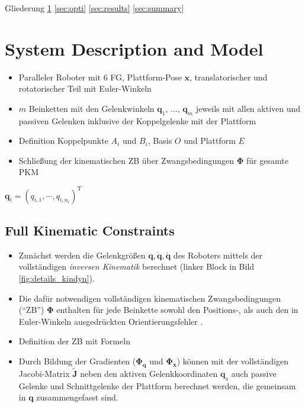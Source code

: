 \documentclass[fleqn,a4paper,10pt]{article}
\newcommand{\bm}[1]{\mathbf{#1}}
\renewcommand{\Phi}[1]{\varPhi{#1}}
\newcommand{\transp}[0]{{\mathrm{T}}}
\renewenvironment{figure}
  {\par\vspace{6pt}\noindent\minipage{\linewidth}}
  {\endminipage\par\vspace{6pt}}
\begin{document}
\begin{multicols}{2}
Gliederung
\ref{sec:sysmdl}
\ref{sec:opti}
\ref{sec:results}
\ref{sec:summary}

\section{System Description and Model}
\label{sec:sysmdl}

\cite{BriotKha2015}

\begin{figure}
\graphicspath{{./Bilder/}}
\centering

\label{fig:PKM_kinematics}
\end{figure}

\begin{itemize}
\item Paralleler Roboter mit 6 FG, Plattform-Pose $\bm{x}$, translatorischer und rotatorischer Teil mit Euler-Winkeln
\item $m$ Beinketten mit den Gelenkwinkeln $\bm{q}_1$, ..., $\bm{q}_m$ jeweils mit allen aktiven und passiven Gelenken inklusive der Koppelgelenke mit der Plattform
\item Definition Koppelpunkte $A_i$ und $B_i$, Basis $O$ und Plattform $E$
\item Schließung der kinematischen ZB über Zwangsbedingungen $\bm{\Phi}$ für gesamte PKM
\end{itemize}


$\bm{q}_i=(q_{i,1},\cdots,q_{i,n_i})^\transp$

\subsection{Full Kinematic Constraints}



\begin{itemize}
\item Zunächst werden die Gelenkgrößen $\bm{q},\dot{\bm{q}},\ddot{\bm{q}}$ des Roboters mittels der vollständigen \emph{inversen Kinematik} berechnet (linker Block in Bild\,\ref{fig:details_kindyn}).
\item Die dafür notwendigen vollständigen kinematischen Zwangsbedingungen (``ZB'') $\bm{\Phi}$ enthalten für jede Beinkette sowohl den Positions-, als auch den in Euler-Winkeln ausgedrückten Orientierungsfehler \cite{SchapplerTapOrt2019c}.
\item Definition der ZB mit Formeln
\item Durch Bildung der Gradienten ($\bm{\Phi}_\bm{q}$ und $\bm{\Phi}_\bm{x}$) können mit der vollständigen Jacobi-Matrix $\tilde{\bm{J}}$ neben den aktiven Gelenkkoordinaten $\bm{q}_\mathrm{a}$ auch passive Gelenke und Schnittgelenke der Plattform berechnet werden, die gemeinsam in $\bm{q}$ zusammengefasst sind.
\end{itemize}



\end{multicols}
\end{document}
